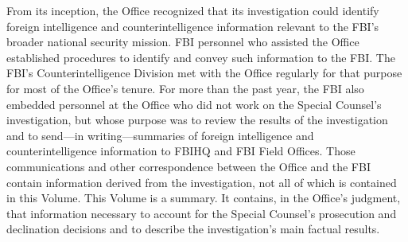 From its inception, the Office recognized that its investigation could identify foreign intelligence and counterintelligence information relevant to the FBI's broader national security mission.
FBI personnel who assisted the Office established procedures to identify and convey such information to the FBI.
The FBI's Counterintelligence Division met with the Office regularly for that purpose for most of the Office's tenure.
For more than the past year, the FBI also embedded personnel at the Office who did not work on the Special Counsel's investigation, but whose purpose was to review the results of the investigation and to send---in writing---summaries of foreign intelligence and counterintelligence information to FBIHQ and FBI Field Offices.
Those communications and other correspondence between the Office and the FBI contain information derived from the investigation, not all of which is contained in this Volume.
This Volume is a summary.
It contains, in the Office's judgment, that information necessary to account for the Special Counsel's prosecution and declination decisions and to describe the investigation's main factual results.

